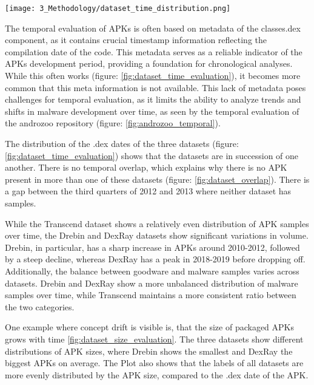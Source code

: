 \begin{figure*}[b]
    \centering
    \begin{minipage}{1.5\textwidth}
        \centering
        \texttt{[image: 3\_Methodology/dataset\_time\_distribution.png]}
        \captionsetup{width=\textwidth}
        \caption{\label{fig:dataset_time_evaluation}
        Temporal distribution of Android APKs across three datasets (Drebin, Transcend, and DexRay), 
        categorized into goodware and malware.
        The Data is derived from metadata of the classes.dex file of each APK.
        }
    \end{minipage}
\end{figure*}

The temporal evaluation of APKs is often based on metadata of the classes.dex component, 
as it contains crucial timestamp information reflecting the compilation date of the code. 
This metadata serves as a reliable indicator of the APKs development period, 
providing a foundation for chronological analyses.
While this often works (figure: \ref{fig:dataset_time_evaluation}), 
it becomes more common that this meta information is not available. 
This lack of metadata poses challenges for temporal evaluation, 
as it limits the ability to analyze trends and shifts in malware development over time, 
as seen by the temporal evaluation of the androzoo repository 
(figure: \ref{fig:androzoo_temporal}).

The distribution of the .dex dates of the three datasets 
(figure: \ref{fig:dataset_time_evaluation}) shows that the datasets are in succession of one another. 
There is no temporal overlap, which explains why there is no APK present in more than one of 
these datasets (figure: \ref{fig:dataset_overlap}). 
There is a gap between the third quarters of 2012 and 2013 where neither dataset has samples. 

While the Transcend dataset shows a relatively even distribution of APK samples over time, 
the Drebin and DexRay datasets show significant variations in volume. 
Drebin, in particular, has a sharp increase in APKs around 2010-2012, 
followed by a steep decline, whereas DexRay has a peak in 2018-2019 before dropping off. 
Additionally, the balance between goodware and malware samples varies across datasets. 
Drebin and DexRay show a more unbalanced distribution of malware samples over time, 
while Transcend maintains a more consistent ratio between the two categories.

One example where concept drift is visible is, 
that the size of packaged APKs grows with time \ref{fig:dataset_size_evaluation}.
The three datasets show different distributions of APK sizes, 
where Drebin shows the smallest and DexRay the biggest APKs on average.
The Plot also shows that the labels of all datasets are more evenly distributed by the APK size, 
compared to the .dex date of the APK.

